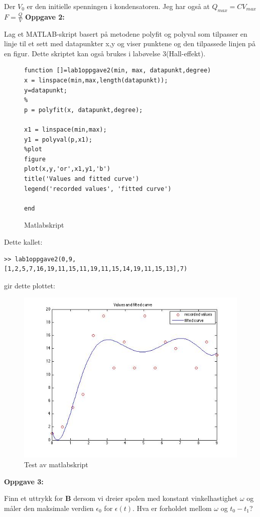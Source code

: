 \documentclass[12pt,a4paper,leqno]{report}
\begin{document}
Der $V_0$ er den initielle spenningen i kondensatoren.
Jeg har også at $Q_{max}=CV_{max}$
$F=\frac{Q}{V}$ 
\pagebreak
\textbf{Oppgave 2:} 

Lag et MATLAB-skript basert på metodene polyfit og polyval som tilpasser en linje til et sett med datapunkter x,y og viser punktene og den tilpassede linjen på en figur. Dette skriptet kan også brukes i labøvelse 3(Hall-effekt).

\begin{figure}
\caption{Matlabskript}
\begin{verbatim}
function []=lab1oppgave2(min, max, datapunkt,degree)
x = linspace(min,max,length(datapunkt));
y=datapunkt;
%
p = polyfit(x, datapunkt,degree);

x1 = linspace(min,max);
y1 = polyval(p,x1);
%plot
figure
plot(x,y,'or',x1,y1,'b')
title('Values and fitted curve')
legend('recorded values', 'fitted curve')

end
\end{verbatim}
\end{figure}
Dette kallet: 
\begin{verbatim}
>> lab1oppgave2(0,9,[1,2,5,7,16,19,11,15,11,19,11,15,14,19,11,15,13],7)
\end{verbatim}
gir dette plottet:
\begin{figure}[H]
\caption{Test av matlabskript}
\centering
\includegraphics[width=\textwidth]{curvefittertest.jpg}
\end{figure}

\textbf{Oppgave 3:} 

Finn et uttrykk for $\mathbf{B}$ dersom vi dreier spolen med konstant vinkelhastighet $\omega$ og måler den maksimale verdien $\epsilon_0$ for $\epsilon(t)$. Hva er forholdet mellom 
$\omega$ og $t_0-t_1$?
\end{document}

